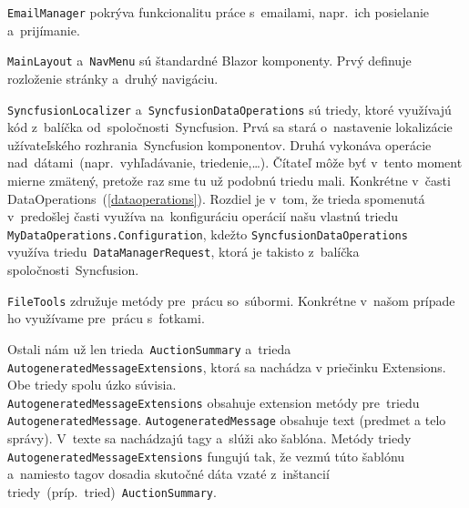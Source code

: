 \verb|EmailManager| pokrýva funkcionalitu práce s~emailami, napr.~ich posielanie a~prijímanie.

\verb|MainLayout| a~\verb|NavMenu| sú štandardné Blazor komponenty. Prvý definuje rozloženie stránky a~druhý navigáciu.

\verb|SyncfusionLocalizer| a~\verb|SyncfusionDataOperations| sú triedy, ktoré využívajú kód z~balíčka od~spoločnosti~Syncfusion. Prvá sa stará o~nastavenie lokalizácie užívateľského rozhrania~Syncfusion komponentov. Druhá vykonáva operácie nad~dátami~(napr.~vyhľadávanie, triedenie,\dots). Čítateľ môže byť v~tento moment mierne zmätený, pretože raz sme tu už podobnú triedu mali. Konkrétne v~časti DataOperations~(\ref{dataoperations}). Rozdiel je v~tom, že trieda spomenutá v~predošlej časti využíva na~konfiguráciu operácií našu vlastnú triedu\\\verb|MyDataOperations.Configuration|, kdežto \verb|SyncfusionDataOperations|\\využíva triedu~\verb|DataManagerRequest|, ktorá je takisto z~balíčka spoločnosti~Syncfusion.

\verb|FileTools| združuje metódy pre~prácu so~súbormi. Konkrétne v~našom prípade ho využívame pre~prácu s~fotkami.

Ostali nám už len trieda~\verb|AuctionSummary| a~trieda\\\verb|AutogeneratedMessageExtensions|, ktorá sa nachádza v priečinku Extensions. Obe triedy spolu úzko súvisia.\\\verb|AutogeneratedMessageExtensions| obsahuje extension metódy pre~triedu\\\verb|AutogeneratedMessage|. \verb|AutogeneratedMessage| obsahuje text (predmet a telo správy). V~texte sa nachádzajú tagy a~slúži ako šablóna. Metódy triedy\\\verb|AutogeneratedMessageExtensions| fungujú tak, že vezmú túto šablónu a~namiesto tagov dosadia skutočné dáta vzaté z~inštancií\\triedy~(príp.~tried)~\verb|AuctionSummary|.
